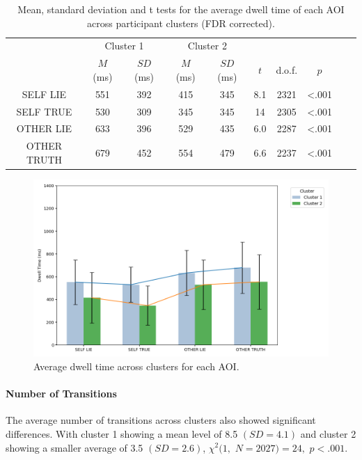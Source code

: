 \documentclass[man, floatsintext]{apa7}
\begin{document}
\begin{table}[H]
	\centering
	\begin{tabular}{cccccccccc}

			\multirow{2}{*}{} & \multicolumn{2}{c}{Cluster 1} & \multicolumn{2}{c}{Cluster 2} & \multicolumn{3}{c}{} \\ \cline{2-5}
			& $M$ (ms) &$SD$ (ms) & $M$ (ms) & $SD$ (ms)  & $t$ & d.o.f. & $p$   \\ \hline
			\small{SELF LIE}& 551 & 392 & 415 & 345 & 8.1 & 2321 & <.001  \\ \hline
			\small{SELF TRUE} & 530 & 309 & 345 & 345& 14 & 2305  &  <.001 \\ \hline
			\small{OTHER LIE} & 633 & 396 &529 & 435 & 6.0 & 2287 &  <.001  \\ \hline
			\small{OTHER TRUTH} & 679 & 452 & 554 & 479 & 6.6 & 2237 &  <.001 \\ \hline
		\end{tabular}
	\vspace{0.3cm}
	\caption{Mean, standard deviation and t tests for the average dwell time of each AOI across participant clusters (FDR corrected).}
	\label{tab:DwellTimesPerCluster}
\end{table}

\begin{figure}[H]
	\centering
	\includegraphics[width=0.75\linewidth]{../plots/ALLTRIAL/DwellTimes.png}
	\caption{Average dwell time across clusters for each AOI.}
	\label{fig:DwellTimesPerCluster}
\end{figure}

\paragraph{Number of Transitions}

The average number of transitions across clusters also showed significant differences. With cluster 1 showing a mean level of 8.5 $(SD = 4.1)$ and cluster 2 showing a smaller average of 3.5 $(SD = 2.6)$, $\chi^2(1,$ $N=2027) = 24,$ $p<.001$.
\end{document}
